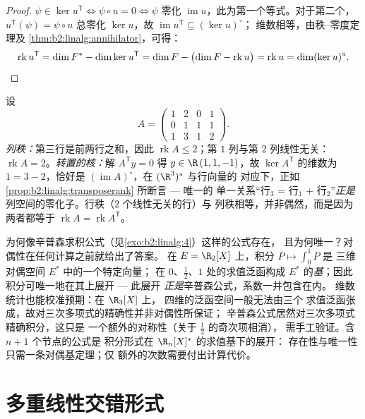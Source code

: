 \begin{proof}
$\psi \in \ker u^{\mathsf T} \iff \psi \circ u = 0 \iff \psi$ 零化
$\operatorname{im} u$，此为第一个等式。对于第二个，$u^{\mathsf
T}(\psi) = \psi \circ u$ 总零化 $\ker u$，故
$\operatorname{im} u^{\mathsf T} \subseteq (\ker u)^\circ$；
维数相等，由秩–零度定理及
\cref{thm:b2:linalg:annihilator}，可得：
\[
\operatorname{rk} u^{\mathsf T} = \dim F^* - \dim\ker u^{\mathsf T}
= \dim F - \bigl(\dim F - \operatorname{rk} u\bigr)
= \operatorname{rk} u
= \dim (\ker u)^{\circ} . \qedhere
\]
\end{proof}

\begin{example}[从两侧读秩]\label{ex:b2:linalg:rankbothsides}
设
\[
A = \begin{pmatrix}
1 & 2 & 0 & 1\\
0 & 1 & 1 & 1\\
1 & 3 & 1 & 2
\end{pmatrix} .
\]
\emph{列秩：}第三行是前两行之和，因此
$\operatorname{rk} A \leq 2$；第 $1$ 列与第 $2$ 列线性无关：
$\operatorname{rk} A = 2$。\emph{转置的核：}解
$A^{\mathsf T}y = 0$ 得 $y \in \R\,(1, 1, -1)$，故 $\ker
A^{\mathsf T}$ 的维数为 $1 = 3 - 2$，恰好是
$(\operatorname{im} A)^\circ$，在 $(\R^3)^*$ 与行向量的
对应下，正如
\cref{prop:b2:linalg:transposerank} 所断言 --- 唯一的
单一关系“行$_3$ = 行$_1$ + 行$_2$”\emph{正是}
列空间的零化子。行秩（$2$ 个线性无关的行）与
列秩相等，并非偶然，而是因为两者都等于
$\operatorname{rk} A = \operatorname{rk} A^{\mathsf T}$。
\end{example}

\begin{example}[对偶性读出求积公式]\label{ex:b2:linalg:quadratureread}
为何像辛普森求积公式（见\cref{exo:b2:linalg:4}）这样的公式存在，
且为何唯一？对偶性在任何计算之前就给出了答案。
在 $E = \R_2[X]$ 上，积分 $P \mapsto \int_0^1 P$ 是
三维对偶空间 $E^*$ 中的一个特定向量；
在 $0$、$\frac12$、$1$ 处的求值泛函构成
$E^*$ 的\emph{基}；因此积分可唯一地在其上展开 --- 此展开
\emph{正是}辛普森公式，系数一并包含在内。
维数统计也能校准预期：在 $\R_3[X]$ 上，
四维的泛函空间一般无法由三个
求值泛函张成，故对三次多项式的精确性并非对偶性所保证；
辛普森公式居然对三次多项式精确积分，这只是
一个额外的对称性（关于 $\frac12$ 的奇次项相消），
需手工验证。含 $n + 1$ 个节点的公式是
积分形式在 $\R_n[X]^*$ 的求值基下的展开：
存在性与唯一性只需一条对偶基定理；仅
额外的次数需要付出计算代价。
\end{example}

\section{多重线性交错形式}

